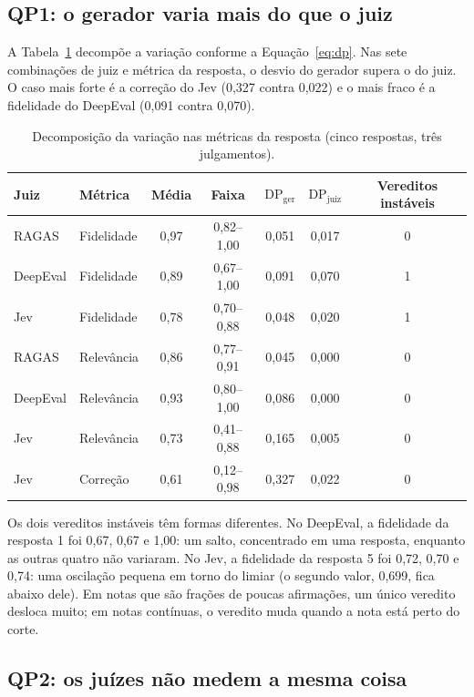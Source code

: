 \documentclass[12pt]{article}
\newcommand{\dpg}{\mathrm{DP}_{\mathrm{ger}}}
\newcommand{\dpj}{\mathrm{DP}_{\mathrm{juiz}}}
\begin{document}
\subsection{QP1: o gerador varia mais do que o juiz}

A Tabela~\ref{tab:variacao} decompõe a variação conforme a Equação~\eqref{eq:dp}. Nas sete combinações de juiz e
métrica da resposta, o desvio do gerador supera o do juiz. O caso mais forte é a
correção do Jev (0,327 contra 0,022) e o mais fraco é a fidelidade do DeepEval
(0,091 contra 0,070).

\begin{table}[htb]
\centering
\small
\caption{Decomposição da variação nas métricas da resposta (cinco respostas, três
julgamentos).}
\label{tab:variacao}
\begin{tabular}{@{}llccccc@{}}
\toprule
Juiz & Métrica & Média & Faixa & $\dpg$ & $\dpj$ & Vereditos instáveis \\
\midrule
RAGAS    & Fidelidade & 0,97 & 0,82--1,00 & 0,051 & 0,017 & 0 \\
DeepEval & Fidelidade & 0,89 & 0,67--1,00 & 0,091 & 0,070 & 1 \\
Jev      & Fidelidade & 0,78 & 0,70--0,88 & 0,048 & 0,020 & 1 \\
RAGAS    & Relevância & 0,86 & 0,77--0,91 & 0,045 & 0,000 & 0 \\
DeepEval & Relevância & 0,93 & 0,80--1,00 & 0,086 & 0,000 & 0 \\
Jev      & Relevância & 0,73 & 0,41--0,88 & 0,165 & 0,005 & 0 \\
Jev      & Correção   & 0,61 & 0,12--0,98 & 0,327 & 0,022 & 0 \\
\bottomrule
\end{tabular}
\end{table}

Os dois vereditos instáveis têm formas diferentes. No DeepEval, a fidelidade da
resposta 1 foi 0,67, 0,67 e 1,00: um salto, concentrado em uma resposta, enquanto as
outras quatro não variaram. No Jev, a fidelidade da resposta 5 foi 0,72, 0,70 e
0,74: uma oscilação pequena em torno do limiar (o segundo valor, 0,699, fica abaixo
dele). Em notas que são frações de poucas afirmações, um único veredito desloca
muito; em notas contínuas, o veredito muda quando a nota está perto do corte.

\subsection{QP2: os juízes não medem a mesma coisa}
\end{document}
